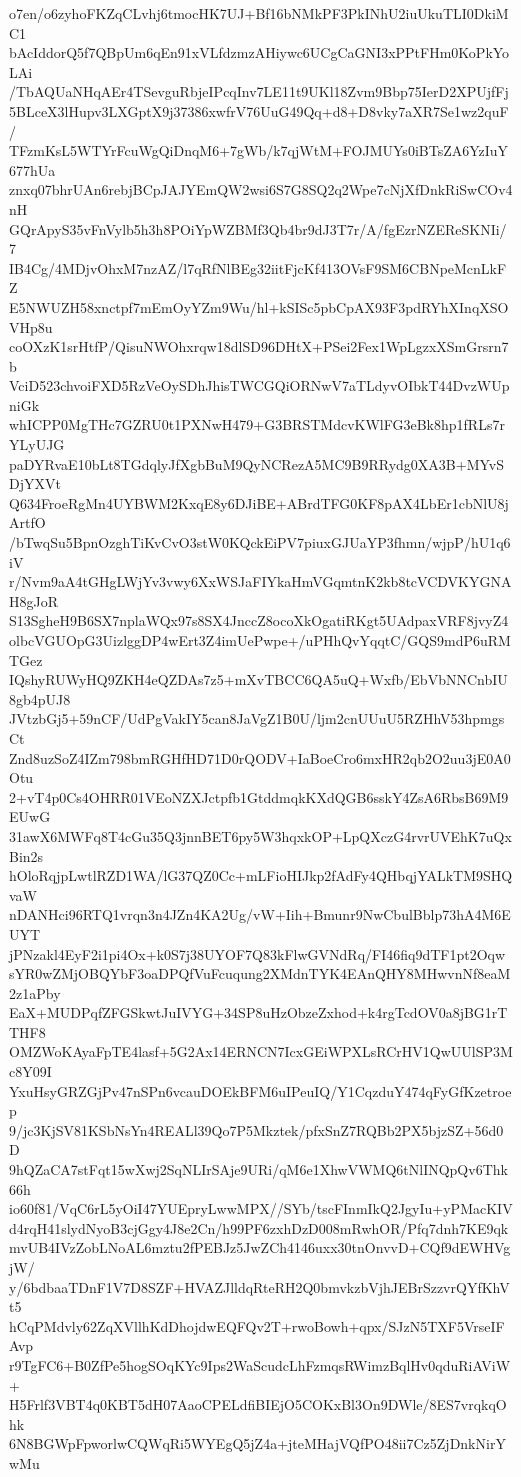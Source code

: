 o7en/o6zyhoFKZqCLvhj6tmocHK7UJ+Bf16bNMkPF3PkINhU2iuUkuTLI0DkiMC1
bAcIddorQ5f7QBpUm6qEn91xVLfdzmzAHiywc6UCgCaGNI3xPPtFHm0KoPkYoLAi
/TbAQUaNHqAEr4TSevguRbjeIPcqInv7LE11t9UKl18Zvm9Bbp75IerD2XPUjfFj
5BLceX3lHupv3LXGptX9j37386xwfrV76UuG49Qq+d8+D8vky7aXR7Se1wz2quF/
TFzmKsL5WTYrFcuWgQiDnqM6+7gWb/k7qjWtM+FOJMUYs0iBTsZA6YzIuY677hUa
znxq07bhrUAn6rebjBCpJAJYEmQW2wsi6S7G8SQ2q2Wpe7cNjXfDnkRiSwCOv4nH
GQrApyS35vFnVylb5h3h8POiYpWZBMf3Qb4br9dJ3T7r/A/fgEzrNZEReSKNIi/7
IB4Cg/4MDjvOhxM7nzAZ/l7qRfNlBEg32iitFjcKf413OVsF9SM6CBNpeMcnLkFZ
E5NWUZH58xnctpf7mEmOyYZm9Wu/hl+kSISc5pbCpAX93F3pdRYhXInqXSOVHp8u
coOXzK1srHtfP/QisuNWOhxrqw18dlSD96DHtX+PSei2Fex1WpLgzxXSmGrsrn7b
VciD523chvoiFXD5RzVeOySDhJhisTWCGQiORNwV7aTLdyvOIbkT44DvzWUpniGk
whICPP0MgTHc7GZRU0t1PXNwH479+G3BRSTMdcvKWlFG3eBk8hp1fRLs7rYLyUJG
paDYRvaE10bLt8TGdqlyJfXgbBuM9QyNCRezA5MC9B9RRydg0XA3B+MYvSDjYXVt
Q634FroeRgMn4UYBWM2KxqE8y6DJiBE+ABrdTFG0KF8pAX4LbEr1cbNlU8jArtfO
/bTwqSu5BpnOzghTiKvCvO3stW0KQckEiPV7piuxGJUaYP3fhmn/wjpP/hU1q6iV
r/Nvm9aA4tGHgLWjYv3vwy6XxWSJaFIYkaHmVGqmtnK2kb8tcVCDVKYGNAH8gJoR
S13SgheH9B6SX7nplaWQx97s8SX4JnccZ8ocoXkOgatiRKgt5UAdpaxVRF8jvyZ4
olbcVGUOpG3UizlggDP4wErt3Z4imUePwpe+/uPHhQvYqqtC/GQS9mdP6uRMTGez
IQshyRUWyHQ9ZKH4eQZDAs7z5+mXvTBCC6QA5uQ+Wxfb/EbVbNNCnbIU8gb4pUJ8
JVtzbGj5+59nCF/UdPgVakIY5can8JaVgZ1B0U/ljm2cnUUuU5RZHhV53hpmgsCt
Znd8uzSoZ4IZm798bmRGHfHD71D0rQODV+IaBoeCro6mxHR2qb2O2uu3jE0A0Otu
2+vT4p0Cs4OHRR01VEoNZXJctpfb1GtddmqkKXdQGB6sskY4ZsA6RbsB69M9EUwG
31awX6MWFq8T4cGu35Q3jnnBET6py5W3hqxkOP+LpQXczG4rvrUVEhK7uQxBin2s
hOloRqjpLwtlRZD1WA/lG37QZ0Cc+mLFioHIJkp2fAdFy4QHbqjYALkTM9SHQvaW
nDANHci96RTQ1vrqn3n4JZn4KA2Ug/vW+Iih+Bmunr9NwCbulBblp73hA4M6EUYT
jPNzakl4EyF2i1pi4Ox+k0S7j38UYOF7Q83kFlwGVNdRq/FI46fiq9dTF1pt2Oqw
sYR0wZMjOBQYbF3oaDPQfVuFcuqung2XMdnTYK4EAnQHY8MHwvnNf8eaM2z1aPby
EaX+MUDPqfZFGSkwtJuIVYG+34SP8uHzObzeZxhod+k4rgTcdOV0a8jBG1rTTHF8
OMZWoKAyaFpTE4lasf+5G2Ax14ERNCN7IcxGEiWPXLsRCrHV1QwUUlSP3Mc8Y09I
YxuHsyGRZGjPv47nSPn6vcauDOEkBFM6uIPeuIQ/Y1CqzduY474qFyGfKzetroep
9/jc3KjSV81KSbNsYn4REALl39Qo7P5Mkztek/pfxSnZ7RQBb2PX5bjzSZ+56d0D
9hQZaCA7stFqt15wXwj2SqNLIrSAje9URi/qM6e1XhwVWMQ6tNlINQpQv6Thk66h
io60f81/VqC6rL5yOiI47YUEpryLwwMPX//SYb/tscFInmIkQ2JgyIu+yPMacKIV
d4rqH41slydNyoB3cjGgy4J8e2Cn/h99PF6zxhDzD008mRwhOR/Pfq7dnh7KE9qk
mvUB4IVzZobLNoAL6mztu2fPEBJz5JwZCh4146uxx30tnOnvvD+CQf9dEWHVgjW/
y/6bdbaaTDnF1V7D8SZF+HVAZJlldqRteRH2Q0bmvkzbVjhJEBrSzzvrQYfKhVt5
hCqPMdvly62ZqXVllhKdDhojdwEQFQv2T+rwoBowh+qpx/SJzN5TXF5VrseIFAvp
r9TgFC6+B0ZfPe5hogSOqKYc9Ips2WaScudcLhFzmqsRWimzBqlHv0qduRiAViW+
H5Frlf3VBT4q0KBT5dH07AaoCPELdfiBIEjO5COKxBl3On9DWle/8ES7vrqkqOhk
6N8BGWpFpworlwCQWqRi5WYEgQ5jZ4a+jteMHajVQfPO48ii7Cz5ZjDnkNirYwMu
